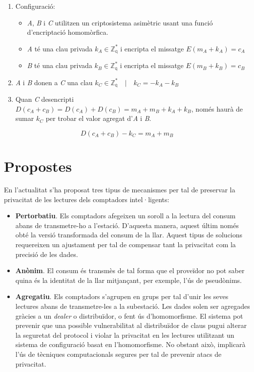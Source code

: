 \documentclass{article}
\begin{document}
\begin{enumerate}
	\item Configuració:
	\begin{itemize}
		\item \textit{A}, \textit{B} i \textit{C} utilitzen un criptosistema asimètric usant una funció d'encriptació homomòrfica.
		\item \textit{A} té una clau privada $k_A \in \mathbb{Z_q^*}$ i encripta el missatge $E(m_A + k_A) = c_A$
		\item \textit{B} té una clau privada $k_B \in \mathbb{Z_q^*}$  i encripta el missatge $E(m_B + k_B) = c_B$
	\end{itemize}
	\item \textit{A} i \textit{B} donen a \textit{C} una clau $k_C \in \mathbb{Z_q^*} \quad | \quad k_C = - k_A - k_B$
	\item Quan \textit{C} desencripti $D(c_A + c_B) = D(c_A) + D(c_B) = m_A + m_B + k_A + k_B$, només haurà de sumar $k_C$ per trobar el valor agregat d'\textit{A} i \textit{B}.
\end{enumerate}
\[D(c_A + c_B) - k_C = m_A + m_B\]
\part{Propostes}\label{part:propostes}

En l'actualitat s'ha proposat tres tipus de mecanismes per tal de preservar la privacitat de les lectures dels comptadors intel·ligents:
\begin{itemize}
	\item \textbf{Pertorbatiu}. Els comptadors afegeixen un soroll a la lectura del consum abans de transmetre-ho a l'estació. D'aquesta manera, aquest últim només obté la versió transformada del consum de la llar. Aquest tipus de solucions requereixen un ajustament per tal de compensar tant la privacitat com la precisió de les dades.
	\item \textbf{Anònim}. El consum és transmès de tal forma que el proveïdor no pot saber quina és la identitat de la llar mitjançant, per exemple, l'ús de pseudònims.
	\item \textbf{Agregatiu}. Els comptadors s'agrupen en grups per tal d'unir les seves lectures abans de transmetre-les a la subestació. Les dades solen ser agregades gràcies a un \textit{dealer} o distribuïdor, o fent ús d'homomorfisme. El sistema pot prevenir que una possible vulnerabilitat al distribuïdor de claus pugui alterar la seguretat del protocol i violar la privacitat en les lectures utilitzant un sistema de configuració basat en l'homomorfisme. No obstant això, implicarà l'ús de tècniques computacionals segures per tal de prevenir atacs de privacitat.
\end{itemize}
\end{document}
